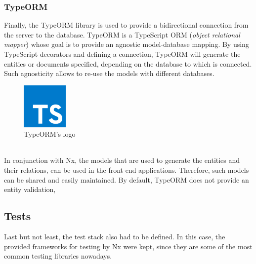 \documentclass[a4paper, 12pt, oneside]{book}
\begin{document}
\subsubsection{TypeORM}
Finally, the TypeORM library is used to provide a bidirectional connection from the server to the database. TypeORM is a TypeScript ORM (\emph{object relational mapper}) whose goal is to provide an agnostic model-database mapping. By using TypeScript decorators and defining a connection, TypeORM will generate the entities or documents specified, depending on the database to which is connected. Such agnosticity allows to re-use the models with different databases. 
\\
\begin{figure}[h!]
	\centering
	\includegraphics[width=0.2\textwidth]{assets/ts-logo.png}
	\caption{TypeORM's logo}
\end{figure}
\\
In conjunction with Nx, the models that are used to generate the entities and their relations, can be used in the front-end applications. Therefore, such models can be shared and easily maintained. By default, TypeORM does not provide an entity validation, 
\subsection{Tests}
Last but not least, the test stack also had to be defined. In this case, the provided frameworks for testing by Nx were kept, since they are some of the most common testing libraries nowadays.
\end{document}

